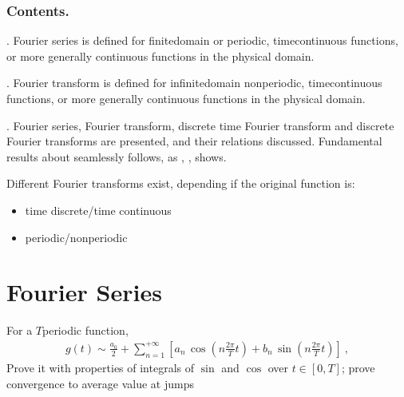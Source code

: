 \documentclass[letterpaper,10pt,english]{jupyterBook}
\begin{document}
\subsubsection*{Contents.}

\sphinxAtStartPar
{\hyperref[\detokenize{ch/complex/fourier-transforms:complex-fourier-series}]{}}. Fourier series is defined for finite\sphinxhyphen{}domain or periodic, time\sphinxhyphen{}continuous functions, or \sphinxhyphen{} more generally \sphinxhyphen{} continuous functions in the physical domain.

\sphinxAtStartPar
{\hyperref[\detokenize{ch/complex/fourier-transforms:complex-fourier-transform}]{}}. Fourier transform is defined for infinite\sphinxhyphen{}domain non\sphinxhyphen{}periodic, time\sphinxhyphen{}continuous functions, or \sphinxhyphen{} more generally \sphinxhyphen{} continuous functions in the physical domain.

\sphinxAtStartPar
{\hyperref[\detokenize{ch/complex/fourier-transforms:complex-fourier-transforms}]{}}. Fourier series, Fourier transform, discrete time Fourier transform and discrete Fourier transforms are presented, and their relations discussed. Fundamental results about  seamlessly follows, as , {\hyperref[\detokenize{ch/complex/fourier-transforms:thm-shannon-nyquist}]{}}, shows.

\sphinxAtStartPar
Different Fourier transforms exist, depending if the original function is:
\begin{itemize}
\item {} 
\sphinxAtStartPar
time discrete/time continuous

\item {} 
\sphinxAtStartPar
periodic/non\sphinxhyphen{}periodic

\end{itemize}

\sphinxstepscope


\section{Fourier Series}
\label{\detokenize{ch/complex/fourier-series:fourier-series}}\label{\detokenize{ch/complex/fourier-series:complex-fourier-series}}\label{\detokenize{ch/complex/fourier-series::doc}}
\sphinxAtStartPar
For a \(T\)\sphinxhyphen{}periodic function,
\begin{equation*}
\begin{split}g(t) \sim \frac{a_0}{2} + \sum_{n=1}^{+\infty} \left[ a_n \, \cos\left( n \frac{2\pi}{T} t \right) + b_n \, \sin\left( n \frac{2 \pi }{T} t \right) \right] \ ,\end{split}
\end{equation*}
\sphinxAtStartPar
{} Prove it with properties of integrals of \(\sin\) and \(\cos\) over \(t \in \left[ 0, T \right]\); prove convergence to average value at jumps
\end{document}
